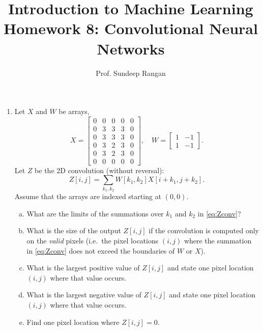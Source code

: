 \documentclass[11pt]{article}
\def\beq{\begin{equation}}
\def\eeq{\end{equation}}
\begin{document}
\title{Introduction to Machine Learning\\
Homework 8:  Convolutional Neural Networks}
\author{Prof. Sundeep Rangan}
\date{}

\maketitle

\begin{enumerate}

\item Let $X$ and $W$ be arrays,
\[
    X = \left[ \begin{array}{ccccc}
        0 & 0 & 0 & 0 & 0 \\
        0 & 3 & 3 & 3 & 0 \\
        0 & 3 & 3 & 3 & 0 \\
        0 & 3 & 2 & 3 & 0 \\
        0 & 3 & 2 & 3 & 0 \\
        0 & 0 & 0 & 0 & 0 
        \end{array} \right], \quad
    W = \left[ \begin{array}{cc}
        1 & -1 \\
        1 & -1 
        \end{array} \right].
\]
Let $Z$ be the 2D convolution (without reversal):
\beq \label{eq:Zconv}
    Z[i,j] = \sum_{k_1,k_2} W[k_1,k_2]X[i+k_1,j+k_2].
\eeq
Assume that the arrays are indexed starting at $(0,0)$.
\begin{enumerate}[(a)]
\item What are the limits of the summations over $k_1$ and $k_2$ in \eqref{eq:Zconv}?
\item What is the size of the output $Z[i,j]$ if the convolution is computed only on the \emph{valid} pixels (i.e.\ the pixel locations $(i,j)$ 
where the summation in \eqref{eq:Zconv} does not exceed the boundaries of $W$ or $X$).
\item What is the largest positive value of $Z[i,j]$ and state one pixel location $(i,j)$ where that value occurs.
\item What is the largest negative value of $Z[i,j]$ and state one pixel location $(i,j)$ where that value occurs.
\item Find one pixel location where $Z[i,j]=0$.
\end{enumerate}


\end{enumerate}
\end{document}
